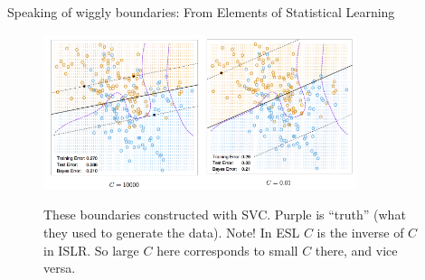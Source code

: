 \documentclass[mathserif, aspectratio=169]{beamer}
\begin{document}
\begin{frame}{Speaking of wiggly boundaries: From Elements of Statistical Learning}

	\begin{figure}
		\includegraphics[width=0.415\textwidth]{ESL_12_2a}\includegraphics[width=0.4\textwidth]{ESL_12_2b}
		\caption*{These boundaries constructed with SVC.  Purple is ``truth'' (what they used to generate the data).  Note!  In ESL $C$ is the inverse of $C$ in ISLR.  So large $C$ here corresponds to small $C$ there, and vice versa.}
	\end{figure}

\end{frame}
\end{document}
